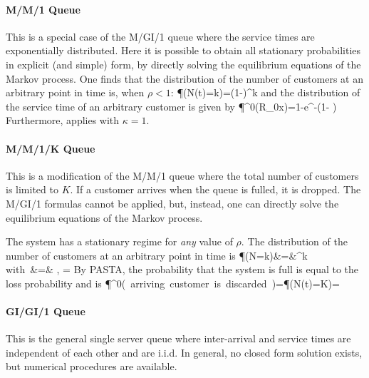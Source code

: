 \paragraph{M/M/1 Queue} This is a special case of
the M/GI/1 queue where the service times are
exponentially distributed. Here it is possible to
obtain all stationary probabilities in explicit
(and simple) form, by directly solving the
equilibrium equations of the Markov process. One
finds that the distribution of the number of
customers at an arbitrary point in time is, when
$\rho <1$:
 \be \P(N(t)=k)=(1-\rho)\rho^k
 \ee
 and the distribution of the service time of an
 arbitrary customer is given by
 \be
 \P^0(R_0\leq x)=1-e^{-(1- \rho)}
 \ee
 Furthermore,
  applies with $\kappa
=1$.%

\paragraph{M/M/1/K Queue}
This is a modification of the M/M/1 queue where
the total number of customers is limited to $K$.
If a customer arrives when the queue is fulled,
it is dropped. The M/GI/1 formulas cannot be
applied, but, instead, one can directly solve the
equilibrium equations of the Markov process.

The system has a stationary regime for \emph{any}
value of $\rho$. The distribution of the number
of customers at an arbitrary point in time is
 \bearn \P(N=k)&=&\eta \rho^k \\
 \mbox{with }\eta&=&  \mif \rho {}, \; \eta= \mif {}
 \eearn
 By PASTA, the probability that the system is full
 is equal to the loss probability and is
 \ben
  \P^0(\mbox{ arriving customer is discarded
  })=\P(N(t)=K)=
  \een

\paragraph{GI/GI/1 Queue}
This is the general single server queue where inter-arrival and
service times are independent of each other and are i.i.d. In
general, no closed form solution exists, but numerical
procedures are available.

